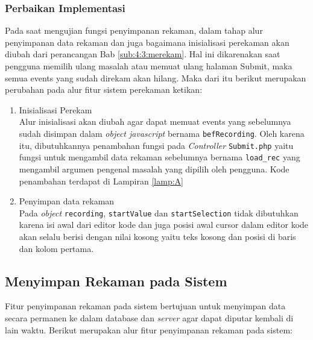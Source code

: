 \subsubsection{Perbaikan Implementasi}

Pada saat mengujian fungsi penyimpanan rekaman, dalam tahap alur penyimpanan data rekaman dan juga bagaimana inisialisasi perekaman akan diubah dari perancangan Bab \ref{sub:4:3:merekam}. Hal ini dikarenakan saat pengguna memilih ulang masalah atau memuat ulang halaman Submit, maka semua events yang sudah direkam akan hilang. Maka dari itu berikut merupakan perubahan pada alur fitur sistem perekaman ketikan:

\begin{enumerate}
    \item Inisialisasi Perekam \\
    Alur inisialisasi akan diubah agar dapat memuat events yang sebelumnya sudah disimpan dalam \textit{object javascript} bernama \verb|befRecording|. Oleh karena itu, dibutuhkannya penambahan fungsi pada \textit{Controller} \verb|Submit.php| yaitu fungsi untuk mengambil data rekaman sebelumnya bernama \verb|load_rec| yang mengambil argumen pengenal masalah yang dipilih oleh pengguna. Kode penambahan terdapat di Lampiran \ref{lamp:A}

    \item Penyimpan data rekaman \\
    Pada \textit{object} \verb|recording|, \verb|startValue| dan \verb|startSelection| tidak dibutuhkan karena isi awal dari editor kode dan juga posisi awal cursor dalam editor kode akan selalu berisi dengan nilai kosong yaitu teks kosong dan posisi di baris dan kolom pertama.
\end{enumerate}

\subsection{Menyimpan Rekaman pada Sistem}
\label{sub:5:2:storerekaman}

Fitur penyimpanan rekaman pada sistem bertujuan untuk menyimpan data secara permanen ke dalam database dan \textit{server} agar dapat diputar kembali di lain waktu. Berikut merupakan alur fitur penyimpanan rekaman pada sistem:

